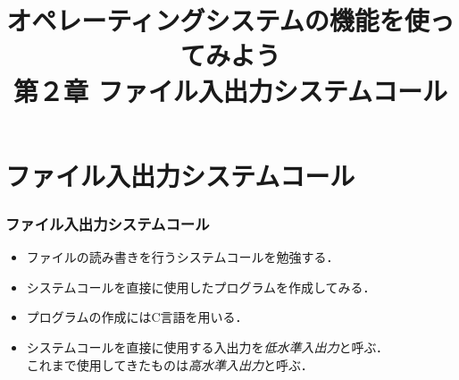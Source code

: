 \documentclass{beamer}                 %
\begin{document}
\title{オペレーティングシステムの機能を使ってみよう\\第２章 ファイル入出力システムコール}
\date{}

\begin{frame}
  \titlepage
\end{frame}


\section{ファイル入出力システムコール}
\begin{frame}
  \frametitle{ファイル入出力システムコール}
  \begin{itemize}
  \item ファイルの読み書きを行うシステムコールを勉強する．
  \item システムコールを直接に使用したプログラムを作成してみる．
  \item プログラムの作成にはC言語を用いる．
  \item システムコールを直接に使用する入出力を\emph{低水準入出力}と呼ぶ．\\
    これまで使用してきたものは\emph{高水準入出力}と呼ぶ．
  \end{itemize}
\end{frame}
\end{document}
